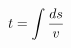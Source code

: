\documentclass[preview]{standalone}
\begin{document}
\begin{align*}
t = \int {ds \over v}
\end{align*}
\end{document}
